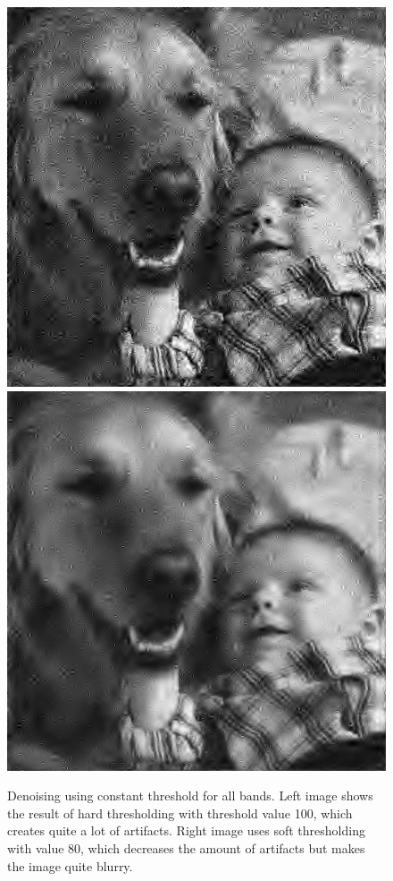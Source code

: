 \documentclass{article}
\begin{document}
\begin{figure}
	\centering
	\includegraphics[scale=0.40]{kd_hard}\includegraphics[scale=0.40]{kd_soft}
	\caption{Denoising using constant threshold for all bands. Left image shows the result of hard thresholding with threshold value 100, which creates quite a lot of artifacts. Right image uses soft thresholding with value 80, which decreases the amount of artifacts but makes the image quite blurry.}\label{fig:constt}
\end{figure}
\end{document}
